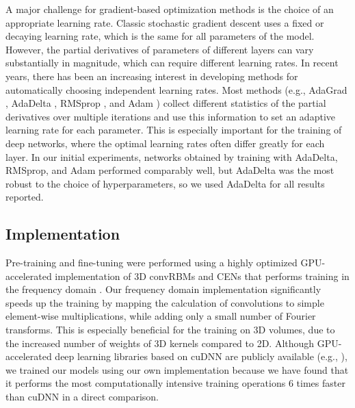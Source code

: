 A major challenge for gradient-based optimization methods is the choice of an
appropriate learning rate. Classic stochastic gradient descent \cite{LeCun1998}
uses a fixed or decaying learning rate, which is the same for all parameters of
the model. However, the partial derivatives of parameters of different layers
can vary substantially in magnitude, which can require different learning rates.
In recent years, there has been an increasing interest in developing methods for
automatically choosing independent learning rates. Most methods (e.g., AdaGrad
\cite{duchi2011adaptive}, AdaDelta \cite{zeiler2012adadelta}, RMSprop
\cite{dauphin2015rmsprop}, and Adam \cite{kingma2014adam}) collect different
statistics of the partial derivatives over multiple iterations and use this
information to set an adaptive learning rate for each parameter. This is
especially important for the training of deep networks, where the optimal
learning rates often differ greatly for each layer. In our initial experiments,
networks obtained by training with AdaDelta, RMSprop, and Adam performed
comparably well, but AdaDelta was the most robust to the choice of
hyperparameters, so we used AdaDelta for all results reported.

\subsection{Implementation}


Pre-training and fine-tuning were performed using a highly optimized
GPU-accelerated implementation of 3D convRBMs and CENs that performs training
in the frequency domain \cite{brosch2014efficient}. Our frequency domain
implementation significantly speeds up the training by mapping the calculation
of convolutions to simple element-wise multiplications, while adding only a
small number of Fourier transforms. This is especially beneficial for the
training on 3D volumes, due to the increased number of weights of 3D kernels
compared to 2D. Although GPU-accelerated deep learning libraries based on cuDNN
\cite{chetlur2014} are publicly available (e.g.,
\cite{jia2014,Bastien2012,collobert2011torch7}), we trained our models using our
own implementation because we have found that it performs the most
computationally intensive training operations 6 times faster than cuDNN in a
direct comparison.
 

